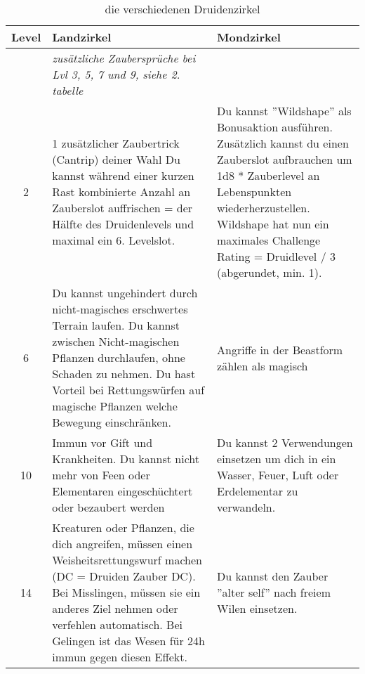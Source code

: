 \begin{table}
	\centering
	\begin{tabular}{cp{6cm}p{6cm}}
	\textbf{Level} & \textbf{Landzirkel} & \textbf{Mondzirkel} \\ \hline
	& \textit{zusätzliche Zaubersprüche bei Lvl 3, 5, 7 und 9, siehe 2. tabelle} & \\ \hline
	2 &
	1 zusätzlicher Zaubertrick (Cantrip) deiner Wahl \linebreak
	Du kannst während einer kurzen Rast kombinierte Anzahl an Zauberslot auffrischen = der Hälfte des Druidenlevels und maximal ein 6. Levelslot. &
	Du kannst ''Wildshape'' als Bonusaktion ausführen. Zusätzlich kannst du einen Zauberslot aufbrauchen um 1d8 * Zauberlevel an Lebenspunkten wiederherzustellen. Wildshape hat nun ein maximales Challenge Rating = Druidlevel / 3 (abgerundet, min. 1). \\ \hline
	
	6 &
	Du kannst ungehindert durch nicht-magisches erschwertes Terrain laufen. Du kannst zwischen Nicht-magischen Pflanzen durchlaufen, ohne Schaden zu nehmen.\linebreak
	Du hast Vorteil bei Rettungswürfen auf magische Pflanzen welche Bewegung einschränken. &
	Angriffe in der Beastform zählen als magisch\\ \hline
	
	10 &
	Immun vor Gift und Krankheiten. Du kannst nicht mehr von Feen oder Elementaren eingeschüchtert oder bezaubert werden &
	Du kannst 2 Verwendungen einsetzen um dich in ein Wasser, Feuer, Luft oder Erdelementar zu verwandeln. \\ \hline
	
	14 &
	Kreaturen oder Pflanzen, die dich angreifen, müssen einen Weisheitsrettungswurf machen (DC = Druiden Zauber DC). Bei Misslingen, müssen sie ein anderes Ziel nehmen oder verfehlen automatisch. Bei Gelingen ist das Wesen für 24h immun gegen diesen Effekt. &
	Du kannst den Zauber ''alter self'' nach freiem Wilen einsetzen.\\
	\end{tabular}
	\caption{die verschiedenen Druidenzirkel}
\end{table}

